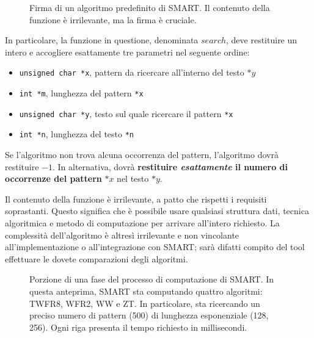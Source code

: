\begin{figure}[ht!]
    \centering
    \caption{Firma di un algoritmo predefinito di SMART. Il contenuto della funzione è irrilevante, ma la firma è cruciale.}
    \label{fig:esempio}
\end{figure}

In particolare, la funzione in questione, denominata $search$, deve restituire un intero e accogliere esattamente tre parametri nel seguente ordine:
\begin{itemize}
    \item \verb|unsigned char *x|, pattern da ricercare all'interno del testo $*y$
    \item \verb|int *m|, lunghezza del pattern \verb|*x|
    \item \verb|unsigned char *y|, testo sul quale ricercare il pattern \verb|*x|
    \item \verb|int *n|, lunghezza del testo \verb|*n|
\end{itemize}

Se l'algoritmo non trova alcuna occorrenza del pattern, l'algoritmo dovrà restituire $-1$. In alternativa, dovrà \textbf{restituire \textit{esattamente} il numero di occorrenze del pattern} $*x$ nel testo $*y$.

Il contenuto della funzione è irrilevante, a patto che rispetti i requisiti soprastanti. Questo significa che è possibile usare qualsiasi struttura dati, tecnica algoritmica e metodo di computazione per arrivare all'intero richiesto. La complessità dell'algoritmo è altresì irrilevante e non vincolante all'implementazione o all'integrazione con SMART; sarà difatti compito del tool effettuare le dovete comparazioni degli algoritmi.

\begin{figure}[ht!]
    \centering
    \caption{Porzione di una fase del processo di computazione di SMART. In questa anteprima, SMART sta computando quattro algoritmi: TWFR8, WFR2, WW e ZT. In particolare, sta ricercando un preciso numero di pattern (500) di lunghezza esponenziale (128, 256). Ogni riga presenta il tempo richiesto in millisecondi.}
    \label{fig:esempio}
\end{figure}

